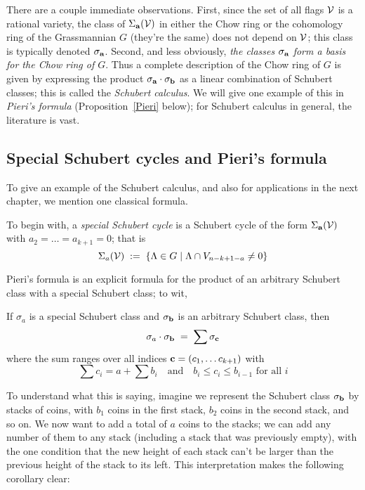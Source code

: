 There are a couple immediate observations. First, since the set of all flags $\cal V$ is a rational variety, the class of $\Sigma_{\bf a}({\cal V})$ in either the Chow ring or the cohomology ring of the Grassmannian $G$ (they're the same) does not depend on $\cal V$; this class is typically denoted $\sigma_{\bf a}$. Second, and less obviously, \emph{the classes $\sigma_{\bf a}$ form a basis for the Chow ring of $G$}. Thus a complete description of the Chow ring of $G$ is given by expressing the product $\sigma_{\bf a} \cdot \sigma_{\bf b}$ as a linear combination of Schubert classes; this is called the \emph{Schubert calculus}. We will give one example of this in \emph{Pieri's formula} (Proposition~\ref{Pieri} below); for Schubert calculus in general, the literature is vast.



\subsection{Special Schubert cycles and Pieri's formula}

To give an example of the Schubert calculus, and also for applications in the next chapter, we mention one classical formula.

To begin with, a \emph{special Schubert cycle} is a Schubert cycle of the form $\Sigma_{\bf a}({\cal V})$ with 
$a_2=\dots = a_{k+1} = 0$; that is
$$
\Sigma_a({\cal V})  \; := \; \left\{ \Lambda \in G \mid \Lambda \cap V_{n-k+1-a} \neq 0 \right\}
$$

Pieri's formula is an explicit formula for the product of an arbitrary Schubert class with a special Schubert class; to wit,
\begin{proposition}\label{Pieri}
If $\sigma_a$ is a special Schubert class and $\sigma_{\bf b}$ is an arbitrary Schubert class, then
$$
\sigma_a \cdot \sigma_{\bf b} \; = \; \sum \sigma_{\bf c}
$$
where the sum ranges over all indices ${\bf c} = (c_1, \dots c_{k+1})$ with
$$
\sum c_i = a + \sum b_i \quad \text{and} \quad b_i \leq c_i \leq b_{i-1} \text{ for all } i
$$
\end{proposition}

To understand what this is saying, imagine we represent the Schubert class $\sigma_{\bf b}$ by stacks of coins, with $b_1$ coins in the first stack, $b_2$ coins in the second stack, and so on. We now want to add a total of $a$ coins to the stacks; we can add any number of them to any stack (including a stack that was previously empty), with the one condition that the new height of each stack can't be larger than the previous height of the stack to its left. This interpretation makes the following corollary clear:

